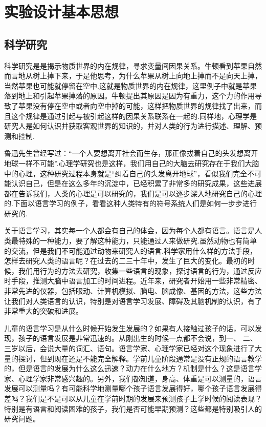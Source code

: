 \setchapterpreamble[u]{\margintoc}
\chapter{实验设计基本思想}

\section{科学研究}
科学研究是是揭示物质世界的内在规律，寻求变量间因果关系。牛顿看到苹果自然而言地从树上掉下来，于是他思考，为什么苹果从树上向地上掉而不是向天上掉，当然苹果也可能就停留在空中.这就是物质世界的内在规律，这里例子中就是苹果落到地上和引起苹果掉落的原因。牛顿提出其原因是因为有重力，这个力的作用导致了苹果没有停在空中或者向空中掉的可能，这样把物质世界的规律找了出来，而且这个规律是通过引起与被引起这样的因果关系联系在一起的.同样地，心理学是研究人是如何认识并获取客观世界的知识的，并对人类的行为进行描述、理解、预测和控制.

鲁迅先生曾经写过：“一个人要想离开社会而生存，那正像拔着自己的头发想离开地球一样不可能”.心理学研究也是这样，我们用自己的大脑去研究存在于我们大脑中的心理，这种研究过程本身就是“纠着自己的头发离开地球”，看似我们完全不可能认识自己，但是在这么多年的沉淀中，已经积累了非常多的研究成果，这些进展都在告诉我们，人类的心理是可以研究的，我们是可以逐步深入地研究自己的心理的.下面以语言学习的例子，看看这种人类特有的符号系统人们是如何一步步进行研究的.

关于语言学习，其实每一个人都会有自己的体会，因为每个人都有语言。语言是人类最特殊的一种能力，要了解这种能力，只能通过人来做研究.虽然动物也有简单的交流，但是我们不可能通过动物来研究人的语言.科学家用什么样的方法手段，怎样去研究人类的语言呢？在过去的二三十年中，发生了巨大的变化。最初的时候，我们用行为的方法去研究，收集一些语言的现象，探讨语言的行为，通过反应时手段，推测大脑中语言加工的时间进程。近年来，研究者开始用一些非常精密、非常先进的仪器，包括眼动、计算机模拟、脑电、脑成像、基因的方法，这些方法让我们对人类语言的认识，特别是对语言学习发展、障碍及其脑机制的认识，有了非常重大的突破和进展。

儿童的语言学习是从什么时候开始发生发展的？如果有人接触过孩子的话，可以发现，孩子的语言发展是非常迅速的。从刚出生的时候一点都不会说，到一、
二、三岁以后，会说大量的词汇、语句。语言学家、心理学家已经对这个现象进行了大量的探讨，但到现在还是不能完全解释。学前儿童阶段通常是没有正规的语言教学的，但是语言的发展为什么这么迅速？动力在什么地方？机制是什么？这是语言学家、心理学家非常感兴趣的。另外，我们都知道，身高、体重是可以测量的，语言发展可以测量吗？有可能科学地测量哪个孩子语言发展得好，哪个孩子语言发展得差吗？我们是不是可以从儿童在学前时期的发展来预测孩子上学时候的阅读表现？特别是有语言和阅读困难的孩子，我们是否可能早期预测？这些都是特别吸引人的研究问题。

